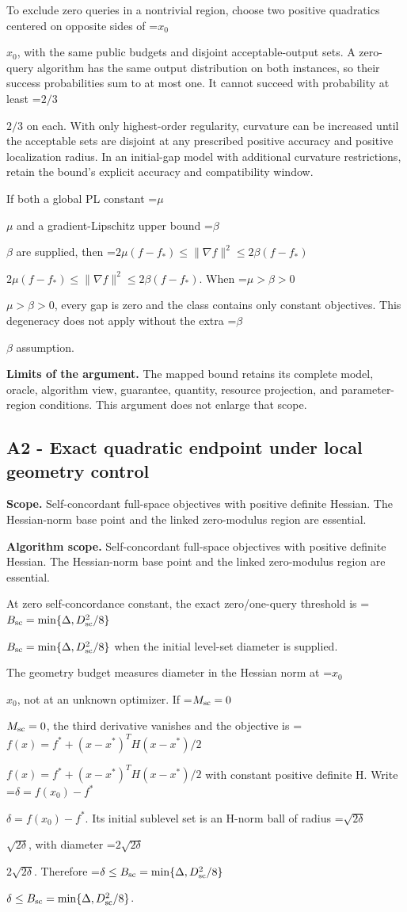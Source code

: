 \documentclass[10pt,a4paper]{article}
\newcommand{\AtlasMath}[1]{\par\begingroup\centering\setbox0=\hbox{$\displaystyle #1$}\ifdim\wd0>1.4\linewidth\typeout{ATLAS WIDE FORMULA: \the\wd0}\fi\ifdim\wd0>\linewidth\resizebox{\linewidth}{!}{\box0}\else\box0\fi\par\endgroup}
\newcommand{\AtlasInlineMath}[1]{\begingroup\setbox0=\hbox{$#1$}\ifdim\wd0>.4\linewidth\endgroup\AtlasMath{#1}\else\endgroup$#1$\fi}
\begin{document}
To exclude zero queries in a nontrivial region, choose two positive quadratics centered on opposite sides of \AtlasInlineMath{x_0}, with the same public budgets and disjoint acceptable-output sets. A zero-query algorithm has the same output distribution on both instances, so their success probabilities sum to at most one. It cannot succeed with probability at least \AtlasInlineMath{2/3} on each. With only highest-order regularity, curvature can be increased until the acceptable sets are disjoint at any prescribed positive accuracy and positive localization radius. In an initial-gap model with additional curvature restrictions, retain the bound's explicit accuracy and compatibility window.

If both a global PL constant \AtlasInlineMath{\mu} and a gradient-Lipschitz upper bound \AtlasInlineMath{\beta} are supplied, then \AtlasInlineMath{2\mu(f-f_*)\le\|\nabla f\|^2\le2\beta(f-f_*)}. When \AtlasInlineMath{\mu>\beta>0}, every gap is zero and the class contains only constant objectives. This degeneracy does not apply without the extra \AtlasInlineMath{\beta} assumption.

\textbf{Limits of the argument.} The mapped bound retains its complete model, oracle, algorithm view, guarantee, quantity, resource projection, and parameter-region conditions. This argument does not enlarge that scope.

\subsection{A2 - Exact quadratic endpoint under local geometry control}
\textbf{Scope.} Self-concordant full-space objectives with positive definite Hessian. The Hessian-norm base point and the linked zero-modulus region are essential.

\textbf{Algorithm scope.} Self-concordant full-space objectives with positive definite Hessian. The Hessian-norm base point and the linked zero-modulus region are essential.

At zero self-concordance constant, the exact zero/one-query threshold is \AtlasInlineMath{B_{\rm sc}=\min\{\Delta,D_{\rm sc}^2/8\}} when the initial level-set diameter is supplied.

The geometry budget measures diameter in the Hessian norm at \AtlasInlineMath{x_0}, not at an unknown optimizer. If \AtlasInlineMath{M_{\rm sc}=0}, the third derivative vanishes and the objective is \AtlasInlineMath{f(x)=f^*+(x-x^*)^TH(x-x^*)/2} with constant positive definite H. Write \AtlasInlineMath{\delta=f(x_0)-f^*}. Its initial sublevel set is an H-norm ball of radius \AtlasInlineMath{\sqrt{2\delta}}, with diameter \AtlasInlineMath{2\sqrt{2\delta}}. Therefore \AtlasInlineMath{\delta\le B_{\rm sc}=\min\{\Delta,D_{\rm sc}^2/8\}}.
\end{document}

